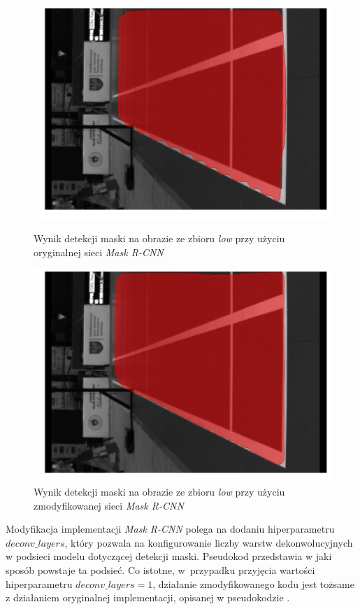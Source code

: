 \begin{figure}[!htb]
    \includegraphics[width=\linewidth]{./original_result_frame_45.jpg}
    \caption{Wynik detekcji maski na obrazie ze zbioru \textit{low} przy użyciu oryginalnej sieci \textit{Mask R-CNN}}
    \label{fig:falbanki_original}
  \endminipage\hfill
    \includegraphics[width=\linewidth]{./56_result_frame_45.jpg}
    \caption{Wynik detekcji maski na obrazie ze zbioru \textit{low} przy użyciu zmodyfikowanej sieci \textit{Mask R-CNN}}
    \label{fig:falbanki_56}
  \endminipage\hfill
\end{figure}

Modyfikacja implementacji \textit{Mask R-CNN} polega na dodaniu hiperparametru $deconv\_layers$, który pozwala na konfigurowanie liczby warstw dekonwolucyjnych w podsieci modelu dotyczącej detekcji maski.
Pseudokod  przedstawia w jaki sposób powstaje ta podsieć. Co istotne, w~przypadku przyjęcia wartości hiperparametru $deconv\_layers = 1$, działanie zmodyfikowanego kodu jest tożsame z działaniem oryginalnej implementacji, opisanej w pseudokodzie .

